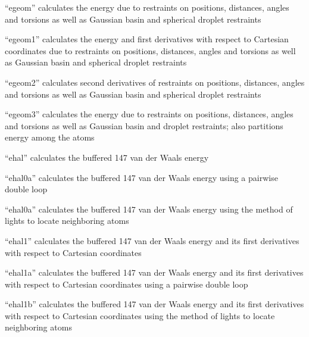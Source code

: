\documentclass[letterpaper,11pt,english]{sphinxmanual}
\begin{document}

“egeom” calculates the energy due to restraints on positions, distances, angles and torsions as well as Gaussian basin and spherical droplet restraints


“egeom1” calculates the energy and first derivatives with respect to Cartesian coordinates due to restraints on positions, distances, angles and torsions as well as Gaussian basin and spherical droplet restraints


“egeom2” calculates second derivatives of restraints on positions, distances, angles and torsions as well as Gaussian basin and spherical droplet restraints


“egeom3” calculates the energy due to restraints on positions, distances, angles and torsions as well as Gaussian basin and droplet restraints; also partitions energy among the atoms


“ehal” calculates the buffered 14\sphinxhyphen{}7 van der Waals energy


“ehal0a” calculates the buffered 14\sphinxhyphen{}7 van der Waals energy using a pairwise double loop


“ehal0a” calculates the buffered 14\sphinxhyphen{}7 van der Waals energy using the method of lights to locate neighboring atoms


“ehal1” calculates the buffered 14\sphinxhyphen{}7 van der Waals energy and its first derivatives with respect to Cartesian coordinates


“ehal1a” calculates the buffered 14\sphinxhyphen{}7 van der Waals energy and its first derivatives with respect to Cartesian coordinates using a pairwise double loop


“ehal1b” calculates the buffered 14\sphinxhyphen{}7 van der Waals energy and its first derivatives with respect to Cartesian coordinates using the method of lights to locate neighboring atoms
\end{document}
